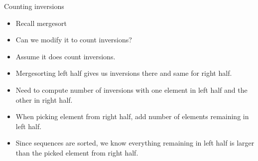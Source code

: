 \documentclass{beamer}
\begin{document}
\begin{frame}[plain]{Counting inversions}
    \begin{itemize}
        \item<1-> Recall mergesort
        \item<1-> Can we modify it to count inversions?
        \item<2-> Assume it does count inversions.
        \item<2-> Mergesorting left half gives us inversions there and same for right half.
        \item<2-> Need to compute number of inversions with one element in left half and the other in right half.
        \item<3-> When picking element from right half, add number of elements remaining in left half.
        \item<3-> Since sequences are sorted, we know everything remaining in left half is larger than the picked element from right half.
    \end{itemize}
\end{frame}
\end{document}
